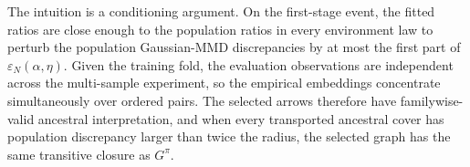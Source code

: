 The intuition is a conditioning argument. On the first-stage event, the fitted ratios are close enough to the population ratios in every environment law to perturb the population Gaussian-MMD discrepancies by at most the first part of \(\varepsilon_N(\alpha,\eta)\). Given the training fold, the evaluation observations are independent across the multi-sample experiment, so the empirical embeddings concentrate simultaneously over ordered pairs. The selected arrows therefore have familywise-valid ancestral interpretation, and when every transported ancestral cover has population discrepancy larger than twice the radius, the selected graph has the same transitive closure as \(G^\pi\).
